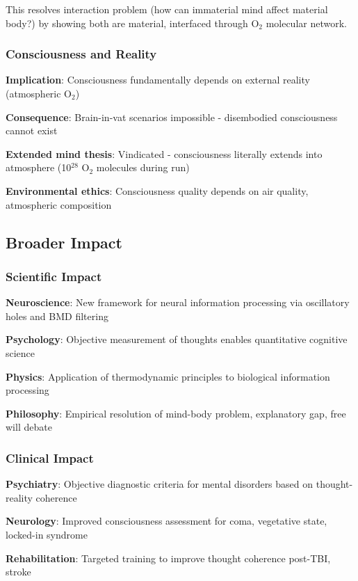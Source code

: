 \documentclass[11pt,onecolumn]{article}
\begin{document}
This resolves interaction problem (how can immaterial mind affect material body?) by showing both are material, interfaced through O$_2$ molecular network.

\subsubsection{Consciousness and Reality}

\textbf{Implication}: Consciousness fundamentally depends on external reality (atmospheric O$_2$)

\textbf{Consequence}: Brain-in-vat scenarios impossible - disembodied consciousness cannot exist

\textbf{Extended mind thesis}: Vindicated - consciousness literally extends into atmosphere (10$^{28}$ O$_2$ molecules during run)

\textbf{Environmental ethics}: Consciousness quality depends on air quality, atmospheric composition

\subsection{Broader Impact}

\subsubsection{Scientific Impact}

\textbf{Neuroscience}: New framework for neural information processing via oscillatory holes and BMD filtering

\textbf{Psychology}: Objective measurement of thoughts enables quantitative cognitive science

\textbf{Physics}: Application of thermodynamic principles to biological information processing

\textbf{Philosophy}: Empirical resolution of mind-body problem, explanatory gap, free will debate

\subsubsection{Clinical Impact}

\textbf{Psychiatry}: Objective diagnostic criteria for mental disorders based on thought-reality coherence

\textbf{Neurology}: Improved consciousness assessment for coma, vegetative state, locked-in syndrome

\textbf{Rehabilitation}: Targeted training to improve thought coherence post-TBI, stroke
\end{document}
